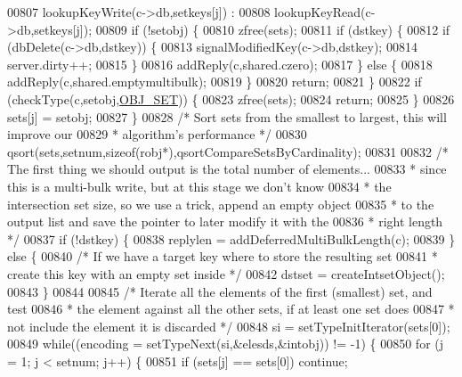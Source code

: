 \begin{DoxyCode}
00807             lookupKeyWrite(c->db,setkeys[j]) :
00808             lookupKeyRead(c->db,setkeys[j]);
00809         \textcolor{keywordflow}{if} (!setobj) \{
00810             zfree(sets);
00811             \textcolor{keywordflow}{if} (dstkey) \{
00812                 \textcolor{keywordflow}{if} (dbDelete(c->db,dstkey)) \{
00813                     signalModifiedKey(c->db,dstkey);
00814                     server.dirty++;
00815                 \}
00816                 addReply(c,shared.czero);
00817             \} \textcolor{keywordflow}{else} \{
00818                 addReply(c,shared.emptymultibulk);
00819             \}
00820             \textcolor{keywordflow}{return};
00821         \}
00822         \textcolor{keywordflow}{if} (checkType(c,setobj,\hyperlink{server_8h_a8d179375a4aac33d3fa7aa80c8ccc75f}{OBJ\_SET})) \{
00823             zfree(sets);
00824             \textcolor{keywordflow}{return};
00825         \}
00826         sets[j] = setobj;
00827     \}
00828     \textcolor{comment}{/* Sort sets from the smallest to largest, this will improve our}
00829 \textcolor{comment}{     * algorithm's performance */}
00830     qsort(sets,setnum,\textcolor{keyword}{sizeof}(robj*),qsortCompareSetsByCardinality);
00831 
00832     \textcolor{comment}{/* The first thing we should output is the total number of elements...}
00833 \textcolor{comment}{     * since this is a multi-bulk write, but at this stage we don't know}
00834 \textcolor{comment}{     * the intersection set size, so we use a trick, append an empty object}
00835 \textcolor{comment}{     * to the output list and save the pointer to later modify it with the}
00836 \textcolor{comment}{     * right length */}
00837     \textcolor{keywordflow}{if} (!dstkey) \{
00838         replylen = addDeferredMultiBulkLength(c);
00839     \} \textcolor{keywordflow}{else} \{
00840         \textcolor{comment}{/* If we have a target key where to store the resulting set}
00841 \textcolor{comment}{         * create this key with an empty set inside */}
00842         dstset = createIntsetObject();
00843     \}
00844 
00845     \textcolor{comment}{/* Iterate all the elements of the first (smallest) set, and test}
00846 \textcolor{comment}{     * the element against all the other sets, if at least one set does}
00847 \textcolor{comment}{     * not include the element it is discarded */}
00848     si = setTypeInitIterator(sets[0]);
00849     \textcolor{keywordflow}{while}((encoding = setTypeNext(si,&elesds,&intobj)) != -1) \{
00850         \textcolor{keywordflow}{for} (j = 1; j < setnum; j++) \{
00851             \textcolor{keywordflow}{if} (sets[j] == sets[0]) \textcolor{keywordflow}{continue};

\end{DoxyCode}
